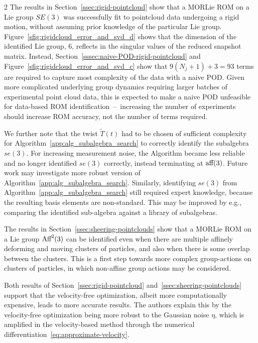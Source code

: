 \documentclass{article}
\begin{document}
\begin{multicols}{2}
The results in Section~\ref{ssec:rigid-pointcloud} show that a MORLie ROM on a Lie group $SE(3)$ was successfully fit to pointcloud data undergoing a rigid motion, without assuming prior knowledge of the particular Lie group. Figure~\ref{sfig:rigidcloud_error_and_svd_d} shows that the dimension of the identified Lie group, 6, reflects in the singular values of the reduced snapshot matrix. Instead, Section~\ref{sssec:naive-POD-rigid-pointcloud} and Figure~\ref{sfig:rigidcloud_error_and_svd_c} show that $9(N_j+1)+3 = 93$ terms are required to capture most complexity of the data with a naive POD. Given more complicated underlying group dynamics requiring larger batches of experimental point cloud data, this is expected to make a naive POD unfeasible for data-based ROM identification~--~increasing the number of experiments should increase ROM accuracy, not the number of terms required. %

We further note that the twist $\widetilde{T}(t)$ had to be chosen of sufficient complexity for Algorithm~\ref{app:alg_subalgebra_search} to correctly identify the subalgebra $se(3)$. For increasing measurement noise, the Algorithm became less reliable and no longer identified $se(3)$ correctly, instead terminating at $\textnormal{aff}(3)$. Future work may investigate more robust version of Algorithm~\ref{app:alg_subalgebra_search}. Similarly, identifying $se(3)$ from Algorithm~\ref{app:alg_subalgebra_search} still required expert knowledge, because the resulting basis elements are non-standard. This may be improved by e.g., comparing the identified sub-algebra against a library of subalgebras.

The results in Section~\ref{ssec:sheering-pointclouds} show that a MORLie ROM on a Lie group $\textnormal{Aff}^2(3)$ can be identified even when there are multiple affinely deforming and moving clusters of particles, and also when there is some overlap between the clusters. This is a first step towards more complex group-actions on clusters of particles, in which non-affine group actions may be considered. 

Both results of Section~\ref{ssec:rigid-pointcloud} and~\ref{ssec:sheering-pointclouds} support that the velocity-free optimization, albeit more computationally expensive, leads to more accurate results. The authors explain this by the velocity-free optimization being more robust to the Gaussian noise $\eta$, which is amplified in the velocity-based method through the numerical differentiation~\eqref{eq:approximate-velocity}. 


\end{multicols}
\end{document}
